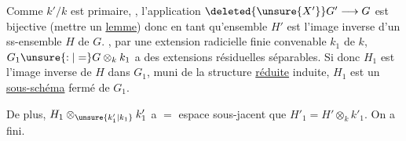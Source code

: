 

Comme $k'/k$ est primaire, , l'application
$\deleted{\unsure{X'}}G'\longrightarrow G$ est bijective (mettre un
\uline{lemme}) donc en tant qu'ensemble
$H'$ est l'image inverse d'un ss-ensemble
 $H$ de $G$. 
,  par
 une extension radicielle finie convenable
$k_1$ de $k$, 
 $G_1\unsure{:|=}G\otimes_k k_1$ a des extensions résiduelles
séparables.  Si donc $H_1$ est l'image
inverse de $H$ dans $G_1$, muni de
la structure \uline{réduite} induite, $H_1$ est
un \uline{sous-schéma}  fermé de $G_1$.

De plus, $H_1\otimes_{\unsure{k'_1|k_1}}k'_1$ a $=$ espace
sous-jacent que $H'_1=H'\otimes_k k'_1$. On a
fini.
